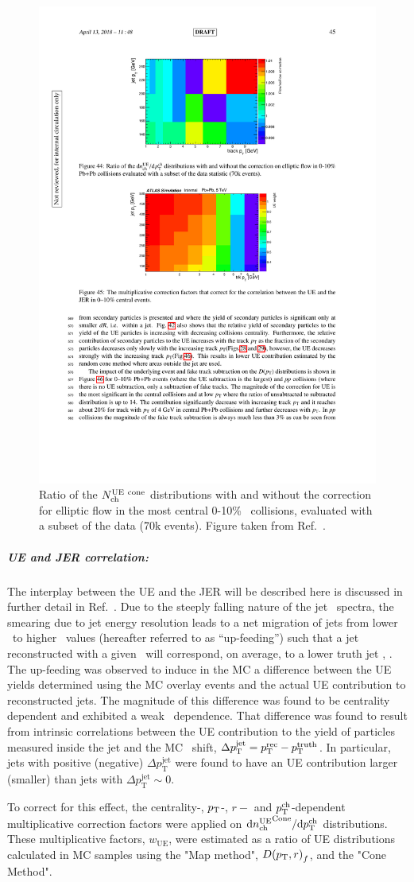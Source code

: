 \begin{figure}
\centering
\includegraphics[width=0.45 \textwidth]{figures/main/UE/flow_correction.pdf}
\caption{Ratio of the $\mbox{$N_{\mathrm{ch}}^{\mathrm{UE\ cone}}$}$ distributions with and without the correction for elliptic flow in the most central 0-10\% \pbpb\ collisions, evaluated with a subset of the data (70k events).
Figure taken from Ref.~\cite{Sickles:2235420}.}
\label{fig:flow_corr}
\end{figure}

\subparagraph{UE and JER correlation: }
The interplay between the UE and the JER will be described here is discussed in further detail in Ref.~\cite{ATLAS-COM-PHYS-2012-1653}.
Due to the steeply falling nature of the jet \pt\ spectra, the smearing due to jet energy resolution leads to a net migration of jets from lower \pt\ to higher \pt\ values (hereafter referred to as ``up-feeding'') such that a jet reconstructed with a given \pTrec\ will correspond, on average, to a lower truth jet \pT, \avgpttrue.
The up-feeding was observed to induce in the MC a difference between the UE yields determined using the MC overlay events and the actual UE contribution to reconstructed jets.
The magnitude of this difference was found to be centrality dependent and exhibited a weak \pTjet\ dependence.
That difference was found to result from intrinsic correlations between the UE contribution to the yield of particles measured inside the jet and the MC \pTjet\ shift, $\Delta p_{\mathrm{T}}^{\mathrm{jet}}= \mbox{$p_{{\mathrm{T}}}^{\mathrm{rec}}$} - \mbox{$p_{\mathrm{T}}^{\mathrm{truth}}$}$.
In particular, jets with positive (negative) $\Delta p_{\mathrm{T}}^{\mathrm{jet}}$ were found to have an UE contribution larger (smaller) than jets with $\Delta p_{\mathrm{T}}^{\mathrm{jet}} \sim 0$.

To correct for this effect, the centrality-, $\mbox{$p_{{\mathrm{T}}}$}$-, $r-$ and $\mbox{$p_{{\mathrm{T}}}^{\mathrm{ch}}$}$-dependent multiplicative correction factors were applied on $\mathrm{d} \mbox{$n_{\mathrm{ch}}^{\mathrm{UE}}$}^{\mathrm{Cone}}/ \mathrm{d} \mbox{$p_{{\mathrm{T}}}^{\mathrm{ch}}$}$ distributions.
These multiplicative factors, $w_{\mathrm{UE}}$, were estimated as a ratio of UE distributions calculated in MC samples using the "Map method", $\mbox{$D( \mbox{$p_{\mathrm{T}}$}, r)$}_{f}$, and the "Cone Method".

